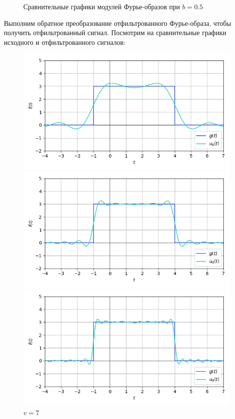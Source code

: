\documentclass[a4paper]{article}
\begin{document}
\begin{figure}[H]
\begin{minipage}{0.33\textwidth}
        \caption{$v = 13$}
    \end{minipage}
    \caption*{Сравнительные графики модулей Фурье-образов при $b=0.5$}
\end{figure}
Выполним обратное преобразование отфильтрованного Фурье-образа, чтобы получить отфильтрованный сигнал. Посмотрим на сравнительные графики исходного и отфильтрованного сигналов:
\begin{figure}[H]
    \begin{minipage}{0.33\textwidth}
        \centering \includegraphics[width=\textwidth]{sources/low-pass filter/denoised (b=0.5, v=3).png}
        \caption{$v = 3$}
    \end{minipage}\hfill
    \begin{minipage}{0.33\textwidth}
        \centering \includegraphics[width=\textwidth]{sources/low-pass filter/denoised (b=0.5, v=7).png}
        \caption{$v = 7$}
    \end{minipage}\hfill
    \begin{minipage}{0.33\textwidth}
        \centering \includegraphics[width=\textwidth]{sources/low-pass filter/denoised (b=0.5, v=13).png}

\end{minipage}
\end{figure}
\end{document}
